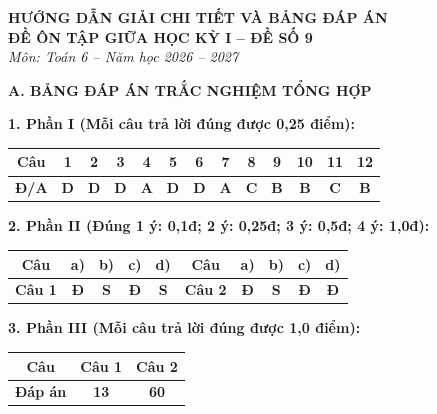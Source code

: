 \documentclass[12pt,a4paper]{article}
\begin{document}
\begin{center}
  \textbf{\Large HƯỚNG DẪN GIẢI CHI TIẾT VÀ BẢNG ĐÁP ÁN}\\
  \textbf{\large ĐỀ ÔN TẬP GIỮA HỌC KỲ I -- ĐỀ SỐ 9}\\
  \textit{Môn: Toán 6 -- Năm học 2026 -- 2027}
\end{center}
\vspace{2mm}

\noindent\textbf{\large A. BẢNG ĐÁP ÁN TRẮC NGHIỆM TỔNG HỢP}
\vspace{1.5mm}

\noindent\textbf{1. Phần I (Mỗi câu trả lời đúng được 0,25 điểm):}
\begin{center}
\begin{tabular}{|c|c|c|c|c|c|c|c|c|c|c|c|c|}
\hline
\textbf{Câu} & \textbf{1} & \textbf{2} & \textbf{3} & \textbf{4} & \textbf{5} & \textbf{6} & \textbf{7} & \textbf{8} & \textbf{9} & \textbf{10} & \textbf{11} & \textbf{12} \\
\hline
\textbf{Đ/A} & \textbf{D} & \textbf{D} & \textbf{D} & \textbf{A} & \textbf{D} & \textbf{D} & \textbf{A} & \textbf{C} & \textbf{B} & \textbf{B} & \textbf{C} & \textbf{B} \\
\hline
\end{tabular}
\end{center}
\vspace{1mm}

\noindent\textbf{2. Phần II (Đúng 1 ý: 0,1đ; 2 ý: 0,25đ; 3 ý: 0,5đ; 4 ý: 1,0đ):}
\begin{center}
\begin{tabular}{|c|c|c|c|c||c|c|c|c|c|}
\hline
\textbf{Câu} & \textbf{a)} & \textbf{b)} & \textbf{c)} & \textbf{d)} & \textbf{Câu} & \textbf{a)} & \textbf{b)} & \textbf{c)} & \textbf{d)} \\
\hline
\textbf{Câu 1} & \textbf{Đ} & \textbf{S} & \textbf{Đ} & \textbf{S} & \textbf{Câu 2} & \textbf{Đ} & \textbf{S} & \textbf{Đ} & \textbf{Đ} \\
\hline
\end{tabular}
\end{center}
\vspace{1mm}

\noindent\textbf{3. Phần III (Mỗi câu trả lời đúng được 1,0 điểm):}
\begin{center}
\begin{tabular}{|c|c|c|}
\hline
\textbf{Câu} & \textbf{Câu 1} & \textbf{Câu 2} \\
\hline
\textbf{Đáp án} & \textbf{13} & \textbf{60} \\
\hline
\end{tabular}
\end{center}
\vspace{3mm}
\end{document}
